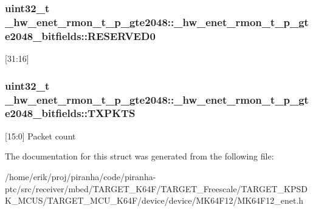 \subsubsection[{\texorpdfstring{R\+E\+S\+E\+R\+V\+E\+D0}{RESERVED0}}]{\setlength{\rightskip}{0pt plus 5cm}uint32\+\_\+t \+\_\+hw\+\_\+enet\+\_\+rmon\+\_\+t\+\_\+p\+\_\+gte2048\+::\+\_\+hw\+\_\+enet\+\_\+rmon\+\_\+t\+\_\+p\+\_\+gte2048\+\_\+bitfields\+::\+R\+E\+S\+E\+R\+V\+E\+D0}\hypertarget{struct__hw__enet__rmon__t__p__gte2048_1_1__hw__enet__rmon__t__p__gte2048__bitfields_a0e72d8603488746f96b91d2fa08f3643}{}\label{struct__hw__enet__rmon__t__p__gte2048_1_1__hw__enet__rmon__t__p__gte2048__bitfields_a0e72d8603488746f96b91d2fa08f3643}
\mbox{[}31\+:16\mbox{]} 
\subsubsection[{\texorpdfstring{T\+X\+P\+K\+TS}{TXPKTS}}]{\setlength{\rightskip}{0pt plus 5cm}uint32\+\_\+t \+\_\+hw\+\_\+enet\+\_\+rmon\+\_\+t\+\_\+p\+\_\+gte2048\+::\+\_\+hw\+\_\+enet\+\_\+rmon\+\_\+t\+\_\+p\+\_\+gte2048\+\_\+bitfields\+::\+T\+X\+P\+K\+TS}\hypertarget{struct__hw__enet__rmon__t__p__gte2048_1_1__hw__enet__rmon__t__p__gte2048__bitfields_af3cc186b1cc1f01b7d5b7b213f933338}{}\label{struct__hw__enet__rmon__t__p__gte2048_1_1__hw__enet__rmon__t__p__gte2048__bitfields_af3cc186b1cc1f01b7d5b7b213f933338}
\mbox{[}15\+:0\mbox{]} Packet count 

The documentation for this struct was generated from the following file\+:\begin{DoxyCompactItemize}
\item 
/home/erik/proj/piranha/code/piranha-\/ptc/src/receiver/mbed/\+T\+A\+R\+G\+E\+T\+\_\+\+K64\+F/\+T\+A\+R\+G\+E\+T\+\_\+\+Freescale/\+T\+A\+R\+G\+E\+T\+\_\+\+K\+P\+S\+D\+K\+\_\+\+M\+C\+U\+S/\+T\+A\+R\+G\+E\+T\+\_\+\+M\+C\+U\+\_\+\+K64\+F/device/device/\+M\+K64\+F12/M\+K64\+F12\+\_\+enet.\+h\end{DoxyCompactItemize}
